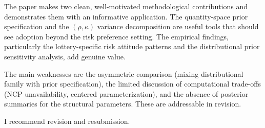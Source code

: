 \documentclass[12pt]{article}
\begin{document}
The paper makes two clean, well-motivated methodological contributions and
demonstrates them with an informative application. The quantity-space prior
specification and the $(\rho, \kappa)$ variance decomposition are useful tools
that should see adoption beyond the risk preference setting. The empirical
findings, particularly the lottery-specific risk attitude patterns and the
distributional prior sensitivity analysis, add genuine value.

The main weaknesses are the asymmetric comparison (mixing distributional family
with prior specification), the limited discussion of computational trade-offs
(NCP unavailability, centered parameterization), and the absence of posterior
summaries for the structural parameters. These are addressable in revision.

I recommend revision and resubmission.
\end{document}
